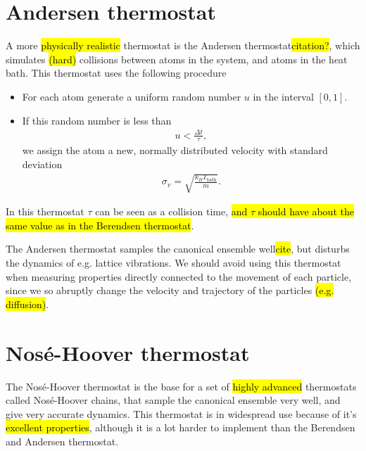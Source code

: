 \section{Andersen thermostat}
A more \hl{physically realistic} thermostat is the Andersen thermostat\hl{citation?}, which simulates \hl{(hard)} collisions between atoms in the system, and atoms in the heat bath. This thermostat uses the following procedure
%
\begin{itemize}
    \item For each atom generate a uniform random number $u$ in the interval $[0,1]$.
    \item If this random number is less than
        \begin{align*}
            u < \frac{\Delta t}{\tau},
        \end{align*}
        we assign the atom a new, normally distributed velocity with standard deviation
        \begin{align*}
            \sigma_v = \sqrt{\frac{k_B T_\text{bath}}{m}}.
        \end{align*}
\end{itemize}
%
In this thermostat $\tau$ can be seen as a collision time, \hl{and $\tau$ should have about the same value as in the Berendsen thermostat}.

The Andersen thermostat samples the canonical ensemble well\hl{cite}, but disturbs the dynamics of e.g. lattice vibrations. We should avoid using this thermostat when measuring properties directly connected to the movement of each particle, since we so abruptly change the velocity and trajectory of the particles \hl{(e.g. diffusion)}.

\section{Nos\'e-Hoover thermostat}
The Nos\'e-Hoover thermostat\cite{nose1984unified,hoover1985canonical} is the base for a set of \hl{highly advanced} thermostats called Nos\'e-Hoover chains, that sample the canonical ensemble very well, and give very accurate dynamics.  This thermostat is in widespread use because of it's \hl{excellent properties}, although it is a lot harder to implement than the Berendsen and Andersen thermostat.

